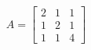 \documentclass[preview]{standalone}
\begin{document}
\begin{align*}
A=\left[\begin{matrix}2&1&1\\1&2&1\\1&1&4\end{matrix}\right]
\end{align*}
\end{document}
